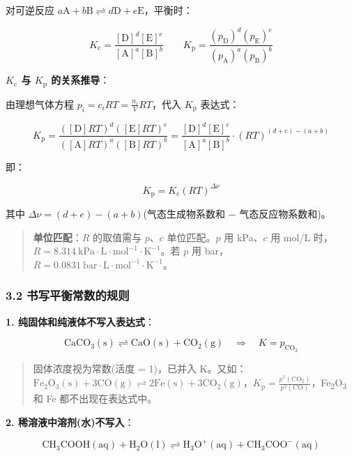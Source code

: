 \documentclass[a4paper,11pt]{ctexart}
\newcommand{\箭}{\ensuremath{\rightarrow}}
\newcommand{\左箭}{\ensuremath{\leftarrow}}
\newcommand{\上箭}{\ensuremath{\uparrow}}
\newcommand{\下箭}{\ensuremath{\downarrow}}
\newcommand{\衡}{\ensuremath{\rightleftharpoons}}
\newcommand{\双箭}{\ensuremath{\leftrightarrow}}
\newcommand{\约等于}{\ensuremath{\approx}}
\newcommand{\小于等于}{\ensuremath{\leq}}
\newcommand{\大于等于}{\ensuremath{\geq}}
\newcommand{\不等于}{\ensuremath{\neq}}
\newcommand{\西格马}{\ensuremath{\sigma}}
\newcommand{\派}{\ensuremath{\pi}}
\begin{document}
对可逆反应 \(a\mathrm{A} + b\mathrm{B} \rightleftharpoons d\mathrm{D} + e\mathrm{E}\)，平衡时：

\[
K_{\mathrm c} = \frac{[\mathrm{D}]^d[\mathrm{E}]^e}{[\mathrm{A}]^a[\mathrm{B}]^b} \qquad K_{\mathrm p} = \frac{(p_\mathrm{D})^d(p_\mathrm{E})^e}{(p_\mathrm{A})^a(p_\mathrm{B})^b}
\]

\textbf{\(K_{\mathrm c}\) 与 \(K_{\mathrm p}\) 的关系推导}：

由理想气体方程 \(p_i = c_i RT = \frac{n_i}{V}RT\)，代入 \(K_{\mathrm p}\) 表达式：

\[
K_{\mathrm p} = \frac{([\mathrm{D}]RT)^d([\mathrm{E}]RT)^e}{([\mathrm{A}]RT)^a([\mathrm{B}]RT)^b} = \frac{[\mathrm{D}]^d[\mathrm{E}]^e}{[\mathrm{A}]^a[\mathrm{B}]^b} \cdot (RT)^{(d+e)-(a+b)}
\]

即：

\[
\boxed{K_{\mathrm p} = K_{\mathrm c}(RT)^{\Delta\nu}}
\]

其中 \(\Delta\nu = (d+e) - (a+b)\)(气态生成物系数和 − 气态反应物系数和)。

\begin{quote}
\textbf{单位匹配}：\(R\) 的取值需与 \(p\)、\(c\) 单位匹配。\(p\) 用 kPa、\(c\) 用 mol/L 时，\(R = 8.314\ \mathrm{kPa \cdot L \cdot mol^{-1} \cdot K^{-1}}\)。若 \(p\) 用 bar，\(R = 0.0831\ \mathrm{bar \cdot L \cdot mol^{-1} \cdot K^{-1}}\)。
\end{quote}

\subsubsection{3.2 书写平衡常数的规则}\label{ux4e66ux5199ux5e73ux8861ux5e38ux6570ux7684ux89c4ux5219}

\textbf{1. 纯固体和纯液体不写入表达式}：

\[
\mathrm{CaCO_3(s) \rightleftharpoons CaO(s) + CO_2(g)} \quad \Rightarrow \quad K = p_{\mathrm{CO_2}}
\]

\begin{quote}
固体浓度视为常数(活度 = 1)，已并入 K。又如：\(\mathrm{Fe_2O_3(s) + 3CO(g) \rightleftharpoons 2Fe(s) + 3CO_2(g)}\)，\(K_{\mathrm p} = \frac{p^3(\mathrm{CO_2})}{p^3(\mathrm{CO})}\)，Fe\textsubscript{2}O\textsubscript{3} 和 Fe 都不出现在表达式中。
\end{quote}

\textbf{2. 稀溶液中溶剂(水)不写入}：

\[
\mathrm{CH_3COOH(aq) + H_2O(l) \rightleftharpoons H_3O^+(aq) + CH_3COO^-(aq)}
\]
\end{document}
